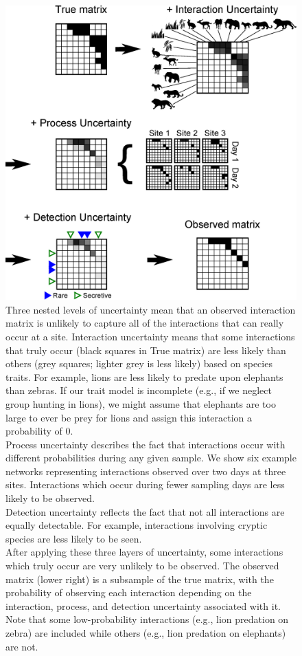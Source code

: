 \documentclass[12pt]{article}
\begin{document}

  \begin{figure}[h!]
    \caption{Three nested levels of uncertainty mean that an observed interaction matrix is unlikely to capture all of the interactions that can really occur at a site. Interaction uncertainty means that some interactions that truly occur (black squares in True matrix) are less likely than others (grey squares; lighter grey is less likely) based on species traits. For example, lions are less likely to predate upon elephants than zebras. If our trait model is incomplete (e.g., if we neglect group hunting in lions), we might assume that elephants are too large to ever be prey for lions and assign this interaction a probability of 0.\\
    Process uncertainty describes the fact that interactions occur with different probabilities during any given sample. We show six example networks representing interactions observed over two days at three sites. Interactions which occur during fewer sampling days are less likely to be observed.\\
    Detection uncertainty reflects the fact that not all interactions are equally detectable. For example, interactions involving cryptic species are less likely to be seen.\\
    After applying these three layers of uncertainty, some interactions which truly occur are very unlikely to be observed. The observed matrix (lower right) is a subsample of the true matrix, with the probability of observing each interaction depending on the interaction, process, and detection uncertainty associated with it. Note that some low-probability interactions (e.g., lion predation on zebra) are included while others (e.g., lion predation on elephants) are not.}
    \label{conceptual_fig}
    \begin{center}
    \includegraphics*[height=.5\textheight]{figures/conceptual_fig.eps}
    \end{center}
    \end{figure}
\end{document}
